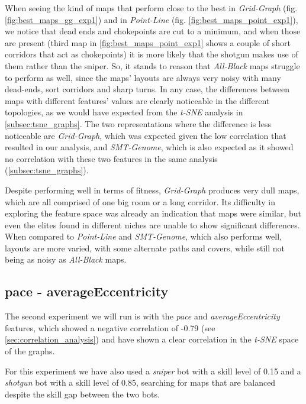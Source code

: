 When seeing the kind of maps that perform close to the best in \textit{Grid-Graph} (fig. \ref{fig:best_maps_gg_exp1}) and in \textit{Point-Line} (fig. \ref{fig:best_maps_point_exp1}), we notice that dead ends and chokepoints are cut to a minimum, and when those are present (third map in \ref{fig:best_maps_point_exp1} shows a couple of short corridors that act as chokepoints) it is more likely that the shotgun makes use of them rather than the sniper. So, it stands to reason that \textit{All-Black} maps struggle to perform as well, since the maps' layouts are always very noisy with many dead-ends, sort corridors and sharp turns. In any case, the differences between maps with different features' values are clearly noticeable in the different topologies, as we would have expected from the \textit{t-SNE} analysis in \cref{subsec:tsne_graphs}. The two representations where the difference is less noticeable are \textit{Grid-Graph}, which was expected given the low correlation that resulted in our analysis, and \textit{SMT-Genome}, which is also expected as it showed no correlation with these two features in the same analysis (\cref{subsec:tsne_graphs}).

Despite performing well in terms of fitness, \textit{Grid-Graph} produces very dull maps, which are all comprised of one big room or a long corridor. Its difficulty in exploring the feature space was already an indication that maps were similar, but even the elites found in different niches are unable to show significant differences. When compared to \textit{Point-Line} and \textit{SMT-Genome}, which also performs well, layouts are more varied, with some alternate paths and covers, while still not being as noisy as \textit{All-Black} maps.

\clearpage

\subsection{pace - averageEccentricity}
\label{subsec:exp2}
The second experiment we will run is with the \textit{pace} and \textit{averageEccentricity} features, which showed a negative correlation of -0.79 (see \cref{sec:correlation_analysis}) and have shown a clear correlation in the \textit{t-SNE} space of the graphs.

For this experiment we have also used a \textit{sniper} bot with a skill level of 0.15 and a \textit{shotgun} bot with a skill level of 0.85, searching for maps that are balanced despite the skill gap between the two bots.


